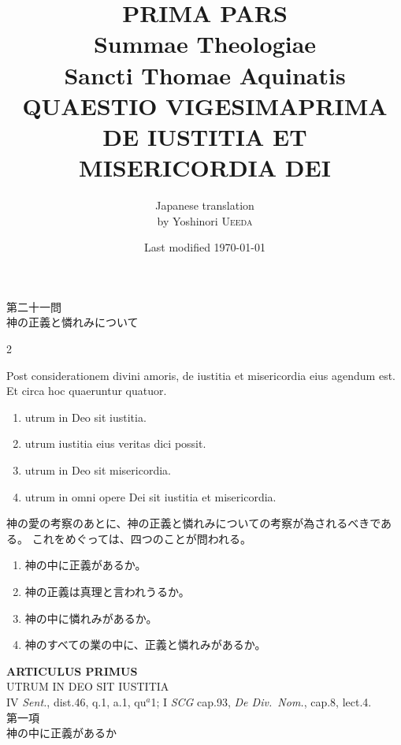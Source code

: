 \documentclass[paper=a4paper,fontsize=10pt,jafontsize=9pt,titlepage]{jlreq}
\title{{\bfseries PRIMA PARS}\\{\Huge Summae Theologiae}\\Sancti Thomae
Aquinatis\\{\sffamily QUAESTIO VIGESIMAPRIMA}\\DE IUSTITIA ET
MISERICORDIA DEI}
\author{Japanese translation\\by Yoshinori {\scshape Ueeda}}
\date{Last modified \today}
\begin{document}
\maketitle
\pagestyle{fancy}

\begin{center}
{\Large 第二十一問\\神の正義と憐れみについて}
\end{center}


\begin{paracol}{2}

Post considerationem divini amoris, de iustitia et misericordia eius
 agendum est. Et circa hoc quaeruntur quatuor. 
\begin{enumerate}
 \item utrum in Deo sit iustitia.
 \item utrum iustitia eius veritas dici possit.
 \item utrum in Deo sit misericordia.
 \item utrum in omni opere Dei sit iustitia et misericordia.
\end{enumerate}

\switchcolumn

神の愛の考察のあとに、神の正義と憐れみについての考察が為されるべきである。
これをめぐっては、四つのことが問われる。
\begin{enumerate}
 \item 神の中に正義があるか。
 \item 神の正義は真理と言われうるか。
 \item 神の中に憐れみがあるか。
 \item 神のすべての業の中に、正義と憐れみがあるか。
\end{enumerate}

\end{paracol}


\newpage
{}
{}
\setcounter{section}{1}
\setcounter{subsection}{0}


\begin{center}
 {\Large {\bfseries ARTICULUS PRIMUS}}\\
 {\large UTRUM IN DEO SIT IUSTITIA}\\
 {\footnotesize IV {\itshape Sent.}, dist.46, q.1, a.1, qu$^a$1; I
 {\itshape SCG} cap.93, {\itshape De Div.~Nom.}, cap.8, lect.4.}\\
 {\Large 第一項\\神の中に正義があるか}
\end{center}
\end{document}
